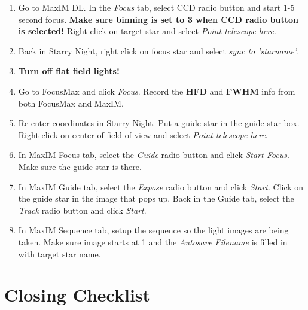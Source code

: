 \documentclass[11pt]{report}
\begin{document}
\begin{enumerate}
\begin{enumerate}
\end{enumerate}
\item Go to MaxIM DL. In the \emph{Focus} tab, select CCD radio button and start 1-5 second focus. {\bf Make sure binning is set to 3 when CCD radio button is selected!} Right click on target star and select \emph{Point telescope here}.
\item Back in Starry Night, right click on focus star and select \emph{sync to 'starname'}.
\item {\bf Turn off flat field lights!}
\item Go to FocusMax and click \emph{Focus}. Record the {\bf HFD} and {\bf FWHM} info from both FocusMax and MaxIM.
\item Re-enter coordinates in Starry Night. Put a guide star in the guide star box. Right click on center of field of view and select \emph{Point telescope here}.
\item In MaxIM Focus tab, select the \emph{Guide} radio button and click \emph{Start Focus}. Make sure the guide star is there.
\item In MaxIM Guide tab, select the \emph{Expose} radio button and click \emph{Start}. Click on the guide star in the image that pops up. Back in the Guide tab, select the \emph{Track} radio button and click \emph{Start}. 
\item In MaxIM Sequence tab, setup the sequence so the light images are being taken. Make sure image starts at 1 and the \emph{Autosave Filename} is filled in with target star name. 
\end{enumerate}

\chapter{Closing Checklist}
\end{document}
